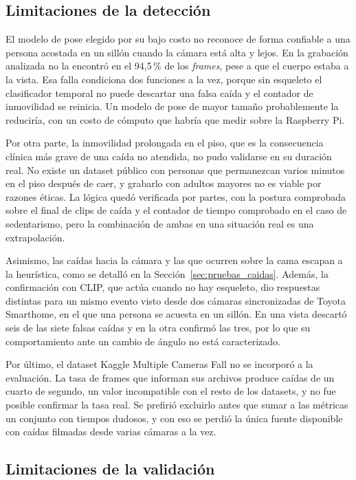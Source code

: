 \subsection{Limitaciones de la detección}

El modelo de pose elegido por su bajo costo no reconoce de forma confiable a una persona acostada en un sillón cuando la cámara está alta y lejos.
En la grabación analizada no la encontró en el 94,5\,\% de los \textit{frames}, pese a que el cuerpo estaba a la vista.
Esa falla condiciona dos funciones a la vez, porque sin esqueleto el clasificador temporal no puede descartar una falsa caída y el contador de inmovilidad se reinicia.
Un modelo de pose de mayor tamaño probablemente la reduciría, con un costo de cómputo que habría que medir sobre la Raspberry Pi.

Por otra parte, la inmovilidad prolongada en el piso, que es la consecuencia clínica más grave de una caída no atendida, no pudo validarse en su duración real.
No existe un dataset público con personas que permanezcan varios minutos en el piso después de caer, y grabarlo con adultos mayores no es viable por razones éticas.
La lógica quedó verificada por partes, con la postura comprobada sobre el final de clips de caída y el contador de tiempo comprobado en el caso de sedentarismo, pero la combinación de ambas en una situación real es una extrapolación.

Asimismo, las caídas hacia la cámara y las que ocurren sobre la cama escapan a la heurística, como se detalló en la Sección~\ref{sec:pruebas_caidas}.
Además, la confirmación con CLIP, que actúa cuando no hay esqueleto, dio respuestas distintas para un mismo evento visto desde dos cámaras sincronizadas de Toyota Smarthome, en el que una persona se acuesta en un sillón.
En una vista descartó seis de las siete falsas caídas y en la otra confirmó las tres, por lo que su comportamiento ante un cambio de ángulo no está caracterizado.

Por último, el dataset Kaggle Multiple Cameras Fall no se incorporó a la evaluación.
La tasa de frames que informan sus archivos produce caídas de un cuarto de segundo, un valor incompatible con el resto de los datasets, y no fue posible confirmar la tasa real.
Se prefirió excluirlo antes que sumar a las métricas un conjunto con tiempos dudosos, y con eso se perdió la única fuente disponible con caídas filmadas desde varias cámaras a la vez.

\subsection{Limitaciones de la validación}

